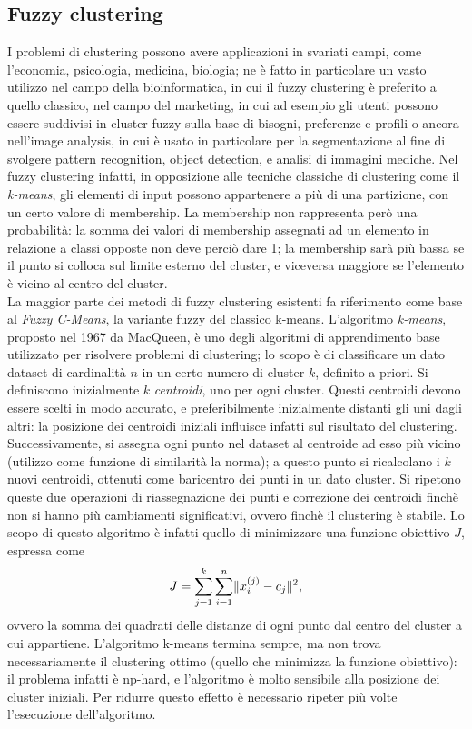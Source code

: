 \documentclass[oneside, openany]{book}
\DeclarePairedDelimiter{\norma}{\lVert}{\rVert}
\begin{document}
	\subsection{Fuzzy clustering}
		I problemi di clustering possono avere applicazioni in svariati campi, come l'economia, psicologia, medicina, biologia; ne è fatto in particolare un vasto utilizzo nel campo della bioinformatica, in cui il fuzzy clustering è preferito a quello classico, nel campo del marketing, in cui ad esempio gli utenti possono essere suddivisi in cluster fuzzy sulla base di bisogni, preferenze e profili o ancora nell'image analysis, in cui è usato in particolare per la segmentazione al fine di svolgere pattern recognition, object detection, e analisi di immagini mediche.
		Nel fuzzy clustering infatti, in opposizione alle tecniche classiche di clustering come il \textit{k-means}, gli elementi di input possono appartenere a più di una partizione, con un certo valore di membership. La membership non rappresenta però una probabilità: la somma dei valori di membership assegnati ad un elemento in relazione a classi opposte non deve perciò dare 1; la membership sarà più bassa se il punto si colloca sul limite esterno del cluster, e viceversa maggiore se l'elemento è vicino al centro del cluster.\\
		
		La maggior parte dei metodi di fuzzy clustering esistenti fa riferimento come base al \textit{Fuzzy C-Means}, la variante fuzzy del classico k-means. L'algoritmo \textit{k-means}, proposto nel 1967 da MacQueen, è uno degli algoritmi di apprendimento base utilizzato per risolvere problemi di clustering; lo scopo è di classificare un dato dataset di cardinalità $n$ in un certo numero di cluster $k$, definito a priori.
		Si definiscono inizialmente $k$ \textit{centroidi}, uno per ogni cluster. Questi centroidi devono essere scelti in modo accurato, e preferibilmente inizialmente distanti gli uni dagli altri: la posizione dei centroidi iniziali influisce infatti sul risultato del clustering. Successivamente, si assegna ogni punto nel dataset al centroide ad esso più vicino (utilizzo come funzione di similarità la norma); a questo punto si ricalcolano i $k$ nuovi centroidi, ottenuti come baricentro dei punti in un dato cluster. Si ripetono queste due operazioni di riassegnazione dei punti e correzione dei centroidi finchè non si hanno più cambiamenti significativi, ovvero finchè il clustering è stabile. Lo scopo di questo algoritmo è infatti quello di minimizzare una funzione obiettivo $J$, espressa come
		\[
			J = \sum_{j=1}^{k}\sum_{i=1}^{n}\norma{x_i^{(j)}-c_j}^2\text{,}
		\]
		ovvero la somma dei quadrati delle distanze di ogni punto dal centro del cluster a cui appartiene. 
		L'algoritmo k-means termina sempre, ma non trova necessariamente il clustering ottimo (quello che minimizza la funzione obiettivo): il problema infatti è np-hard, e l'algoritmo è molto sensibile alla posizione dei cluster iniziali. Per ridurre questo effetto è necessario ripeter più volte l'esecuzione dell'algoritmo.\\
		
\end{document}
